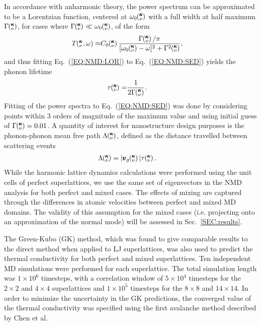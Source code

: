 \documentclass[aps,prb,preprint,preprintnumbers,amsmath,amssymb,floatfix,superscriptaddress]{revtex4}
\newcommand{\kvw}{\mspace{-4.0mu}\left(\mspace{-8.0mu}
\begin{smallmatrix}&\pmb{\kappa} \\&\nu\end{smallmatrix}
\mspace{-2.0mu},\omega\right)}
\newcommand{\kv}{\mspace{-4.0mu}\left(\mspace{-8.0mu}
\begin{smallmatrix}&\pmb{\kappa} \\&\nu\end{smallmatrix}
\mspace{-3.0mu}\right)}
\begin{document}
In accordance with anharmonic theory,\cite{maradudin_scattering_1962} the power spectrum can be approximated to be a Lorentzian function, centered at $\omega_0\kv$ with a full width at half maximum $\Gamma\kv$, for cases where $\Gamma\kv \ll \omega_0\kv$, of the form 
\begin{equation}\label{EQ:NMD:LOR}
\begin{split}
T\kvw\approx&C_0\kv\frac{\Gamma\kv/\pi}{[\omega_0\kv-\omega]^2+\Gamma^2\kv},
\end{split}
\end{equation}
and thus fitting Eq.~(\ref{EQ:NMD:LOR}) to Eq.~(\ref{EQ:NMD:SED}) yields the phonon lifetime
\begin{equation}\label{EQ:lifetime}
\begin{split}
\tau\kv=&\frac{1}{2\Gamma\kv}.
\end{split}
\end{equation}
Fitting of the power spectra to Eq.~(\ref{EQ:NMD:SED}) was done by considering points within 3 orders of magnitude of the maximum value and using initial guess of $\Gamma\kv=0.01$. A quantity of interest for nanostructure design purposes \cite{PhysRevB.87.035437} is the phonon-phonon mean free path $\Lambda\kv$, defined as the distance travelled between scattering events \cite{ziman_electrons_2001}
\begin{equation}\label{EQ:M:phonon_mfp}
\begin{split}
\Lambda\kv &= |\pmb{v}_{g}\kv {}| \tau\kv.
\end{split}
\end{equation}
While the harmonic lattice dynamics calculations were performed using the unit cells of perfect superlattices, we use the same set of eigenvectors in the NMD analysis for both perfect and mixed cases. The effects of mixing are captured through the differences in atomic velocities between perfect and mixed MD domains. The validity of this assumption for the mixed cases (i.e. projecting onto an approximation of the normal mode) will be assessed in Sec.~\ref{SEC:results}.

The Green-Kubo (GK) method, which was found to give comparable results to the direct method when applied to LJ superlattices,\cite {PhysRevB.79.075316} was also used to predict the thermal conductivity for both perfect and mixed superlattices. Ten independent MD simulations were performed for each superlattice. The total  simulation length was $1\times 10^6$ timesteps, with a correlation window of $5\times 10^4$ timesteps for the $2 \times 2$ and $4 \times 4$ superlattices and $1\times 10^5$ timesteps for the $8 \times 8$ and $14 \times 14$. In order to minimize the uncertainty in the GK predictions, the converged value of the thermal conductivity was specified using the first avalanche method described by Chen et al. \cite{Chen20102392}
\end{document}
